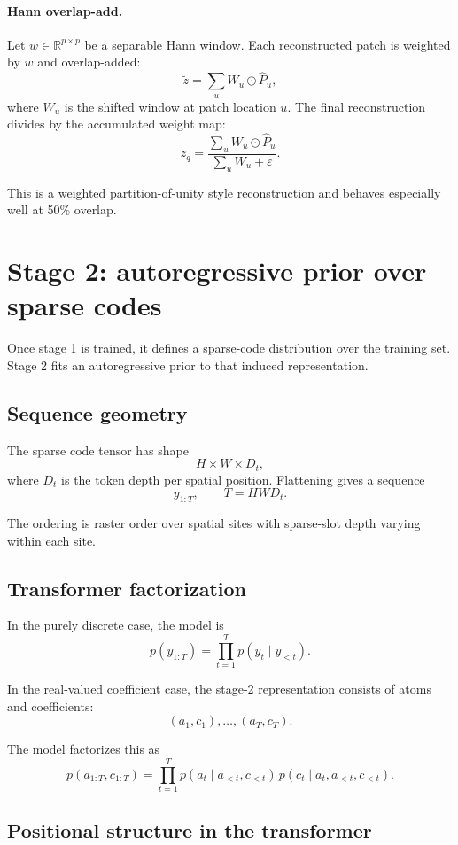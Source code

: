 \documentclass[11pt]{article}
\newcommand{\R}{\mathbb{R}}
\begin{document}
\paragraph{Hann overlap-add.}
Let $w \in \R^{p \times p}$ be a separable Hann window. Each reconstructed patch is weighted by $w$ and overlap-added:
\[
\tilde z = \sum_u W_u \odot \hat P_u,
\]
where $W_u$ is the shifted window at patch location $u$. The final reconstruction divides by the accumulated weight map:
\[
z_q = \frac{\sum_u W_u \odot \hat P_u}{\sum_u W_u + \varepsilon}.
\]

This is a weighted partition-of-unity style reconstruction and behaves especially well at 50\% overlap.

\section{Stage 2: autoregressive prior over sparse codes}

Once stage 1 is trained, it defines a sparse-code distribution over the training set. Stage 2 fits an autoregressive prior to that induced representation.

\subsection{Sequence geometry}

The sparse code tensor has shape
\[
H \times W \times D_t,
\]
where $D_t$ is the token depth per spatial position. Flattening gives a sequence
\[
y_{1:T}, \qquad T = H W D_t.
\]

The ordering is raster order over spatial sites with sparse-slot depth varying within each site.

\subsection{Transformer factorization}

In the purely discrete case, the model is
\[
p(y_{1:T}) = \prod_{t=1}^{T} p(y_t \mid y_{<t}).
\]

In the real-valued coefficient case, the stage-2 representation consists of atoms and coefficients:
\[
(a_1,c_1), \dots, (a_T,c_T).
\]

The model factorizes this as
\[
p(a_{1:T}, c_{1:T})
=
\prod_{t=1}^{T}
p(a_t \mid a_{<t}, c_{<t})
\,
p(c_t \mid a_t, a_{<t}, c_{<t}).
\]

\subsection{Positional structure in the transformer}
\end{document}
